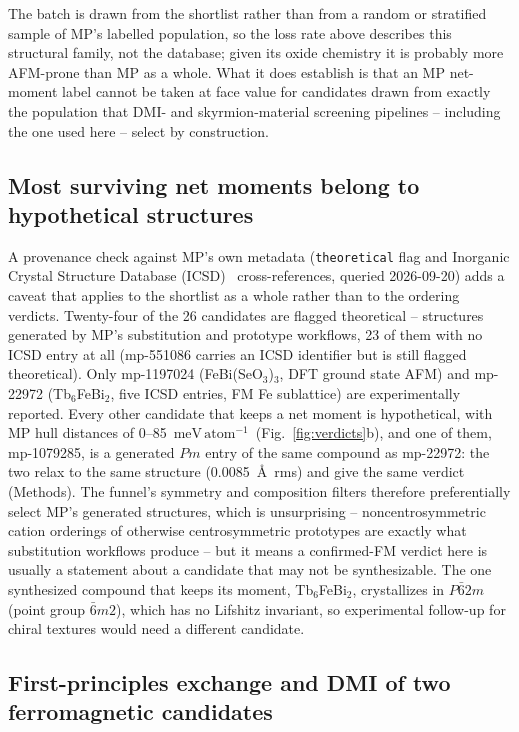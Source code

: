 \documentclass[aps,prb,preprint,superscriptaddress,longbibliography,nofootinbib]{revtex4-2}
\newcommand{\meVat}{\ensuremath{\mathrm{meV\,atom^{-1}}}}
\begin{document}
The batch is drawn from the shortlist rather than from a random or stratified sample of MP's labelled
population, so the loss rate above describes this structural family, not the database; given its oxide
chemistry it is probably more AFM-prone than MP as a whole. What it does establish is that an MP net-moment label
cannot be taken at face value for candidates drawn from exactly the population that DMI- and skyrmion-material
screening pipelines -- including the one used here -- select by construction.

\subsection*{Most surviving net moments belong to hypothetical structures}

A provenance check against MP's own metadata (\texttt{theoretical} flag and Inorganic Crystal Structure Database (ICSD)~\cite{hellenbrandt2004}
cross-references, queried 2026-09-20) adds a caveat that applies to the shortlist as a whole rather than to the
ordering verdicts. Twenty-four of the 26 candidates are flagged theoretical -- structures generated by MP's
substitution and prototype workflows, 23 of them with no ICSD entry at all (mp-551086 carries an ICSD
identifier but is still flagged theoretical). Only mp-1197024 (FeBi(SeO$_3$)$_3$, DFT ground state AFM) and
mp-22972 (Tb$_6$FeBi$_2$, five ICSD entries, FM Fe sublattice) are experimentally reported. Every other
candidate that keeps a net moment is hypothetical, with MP hull distances of 0--85~\meVat\
(Fig.~\ref{fig:verdicts}b), and one of them, mp-1079285, is a generated $Pm$ entry of the same compound as
mp-22972: the two relax to the same structure (0.0085~\AA\ rms) and give the same verdict (Methods).
The funnel's symmetry
and composition filters therefore preferentially select MP's generated structures, which is unsurprising --
noncentrosymmetric cation orderings of otherwise centrosymmetric prototypes are exactly what substitution
workflows produce -- but it means a confirmed-FM verdict here is usually a statement about a candidate that may not be
synthesizable. The one synthesized compound that keeps its moment, Tb$_6$FeBi$_2$, crystallizes in
$P\bar{6}2m$ (point group $\bar{6}m2$), which has no Lifshitz invariant, so experimental follow-up for chiral
textures would need a different candidate.

\subsection*{First-principles exchange and DMI of two ferromagnetic candidates}
\end{document}
